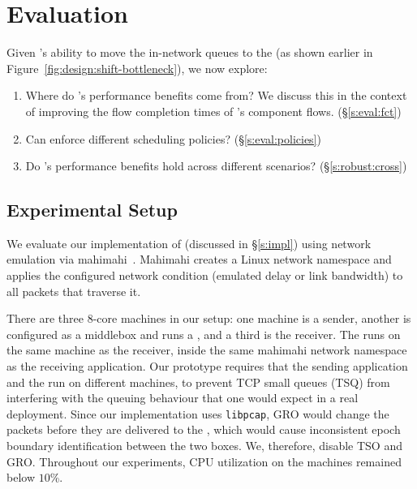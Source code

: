 \section{Evaluation}\label{s:eval}

Given \name's ability to move the in-network queues to the \inbox (as shown earlier in Figure~\ref{fig:design:shift-bottleneck}), we now explore:
\begin{enumerate}[leftmargin=15pt]
    \item Where do \name's performance benefits come from? We discuss this in the context of improving the flow completion times of \name's component flows. (\S\ref{s:eval:fct})
    \item Can \name enforce different scheduling policies? (\S\ref{s:eval:policies})
    \item Do \name's performance benefits hold across different scenarios? (\S\ref{s:robust:cross})
\end{enumerate}


\subsection{Experimental Setup}\label{s:eval:setup}

We evaluate our implementation of \name (discussed in \S\ref{s:impl}) using network emulation via mahimahi~\cite{mahimahi}.
Mahimahi creates a Linux network namespace and applies the configured network condition (emulated delay or link bandwidth) to all packets that traverse it. 

There are three $8$-core machines in our setup: one machine is a sender, another is configured as a middlebox and runs a \inbox, and a third is the receiver. The \outbox runs on the same machine as the receiver, inside the same mahimahi network namespace as the receiving application. 
Our prototype requires that the sending application and the \inbox run on different machines, to prevent TCP small queues (TSQ) from interfering with the queuing behaviour that one would expect in a real deployment. 
Since our \outbox implementation uses \texttt{libpcap}, GRO would change the packets before they are delivered to the \outbox, which would cause inconsistent epoch boundary identification between the two boxes. We, therefore, disable TSO and GRO.
Throughout our experiments, CPU utilization on the machines remained below $10$\%.

